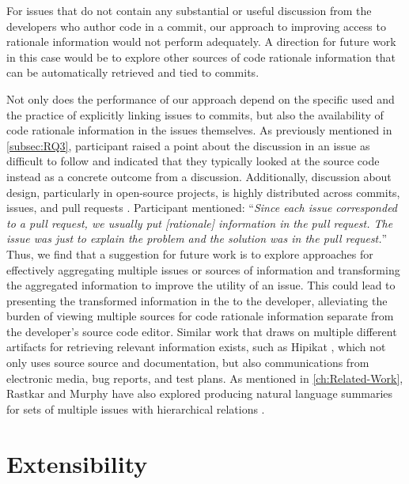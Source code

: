 For issues that do not contain any substantial or useful discussion from
the developers who author code in a commit,
our approach to improving access to rationale information would not perform adequately.
A direction for future work in this case would be to explore other sources of
code rationale information that can be automatically retrieved and tied to commits.

Not only does the performance of our approach depend on the specific
 used and the practice of explicitly linking issues to commits,
but also the availability of code rationale information in the issues themselves.
As previously mentioned in \autoref{subsec:RQ3},
participant  raised a point about the discussion in an issue as difficult to 
follow and indicated that they typically looked at the source code instead
as a concrete outcome from a discussion.
Additionally, discussion about design, particularly in open-source projects,
is highly distributed across commits, issues, and pull requests \cite{brunet_design_2014}.
Participant  mentioned:
``\textit{Since each issue corresponded to a pull request, we usually put [rationale] information in the pull request. 
The issue was just to explain the problem and the solution was in the pull request.}''
Thus, we find that a suggestion for future work is to explore approaches for effectively aggregating multiple issues
or sources of information and transforming the aggregated information to improve the utility of an issue. 
This could lead to presenting the transformed information in the  to the developer,
alleviating the burden of viewing multiple sources for code rationale information separate from the developer's
source code editor.
Similar work that draws on multiple different artifacts for retrieving relevant information exists,
such as Hipikat \cite{cubranic_hipikat_2005}, which not only uses source source and documentation, 
but also communications from electronic media, bug reports, and test plans.
As mentioned in \autoref{ch:Related-Work}, Rastkar and Murphy have also explored
producing natural language summaries for sets of multiple issues with hierarchical relations \cite{rastkar_why_2013}.


\section{Extensibility}

